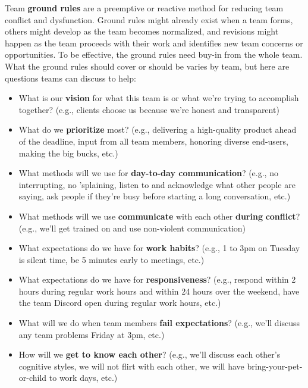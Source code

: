 Team \textbf{ground rules} are a preemptive or reactive method for reducing team conflict and dysfunction. Ground rules might already exist when a team forms, others might develop as the team becomes normalized, and revisions might happen as the team proceeds with their work and identifies new team concerns or opportunities. To be effective, the ground rules need buy-in from the whole team. What the ground rules should cover or should be varies by team, but here are questions teams can discuss to help:
\begin{itemize}
    \item \marginpar{\groundRulesDef\margindivider}What is our \textbf{vision} for what this team is or what we're trying to accomplish together? (e.g., clients choose us because we're honest and transparent)
    \item What do we \textbf{prioritize} most? (e.g., delivering a high-quality product ahead of the deadline, input from all team members, honoring diverse end-users, making the big bucks, etc.)
    \item What methods will we use for \textbf{day-to-day communication}? (e.g., no interrupting, no 'splaining, listen to and acknowledge what other people are saying, ask people if they're busy before starting a long conversation, etc.)
    \item What methods will we use \textbf{communicate} with each other \textbf{during} \textbf{conflict}? (e.g., we'll get trained on and use non-violent communication)
    \item What expectations do we have for \textbf{work habits}? (e.g., 1 to 3pm on Tuesday is silent time, be 5 minutes early to meetings, etc.)
    \item What expectations do we have for \textbf{responsiveness}? (e.g., respond within 2 hours during regular work hours and within 24 hours over the weekend, have the team Discord open during regular work hours, etc.)
    \item What will we do when team members \textbf{fail expectations}? (e.g., we'll discuss any team problems Friday at 3pm, etc.)
    \item How will we \textbf{get to know each other}? (e.g., we'll discuss each other's cognitive styles, we will not flirt with each other, we will have bring-your-pet-or-child to work days, etc.)
\end{itemize}

